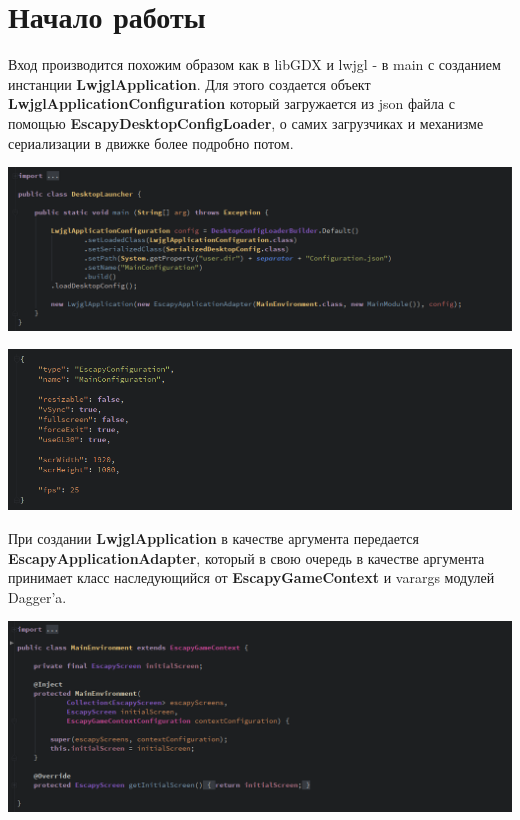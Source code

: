 \documentclass[11pt]{report}
\begin{document}
\chapter{Начало работы}
Вход производится похожим образом как в libGDX и lwjgl - в main с созданием инстанции
\textbf{LwjglApplication}. Для этого создается объект \textbf{LwjglApplicationConfiguration} который загружается из json файла с помощью 
\textbf{EscapyDesktopConfigLoader}, о самих загрузчиках и механизме сериализации в движке более подробно потом. 
\begin{center}
	\includegraphics[width=1.25\linewidth]{img/1.png} 
  	\label{img:12}
  	  	
  	\includegraphics[width=1.25\linewidth]{img/2.png}   	
\end{center}
При создании \textbf{LwjglApplication} в качестве аргумента передается\\
\textbf{EscapyApplicationAdapter}, который в свою очередь в качестве аргумента принимает класс наследующийся от \textbf{EscapyGameContext} и varargs модулей Dagger'a.
\begin{center}
	\includegraphics[width=1.25\linewidth]{img/3.png} 
  	\label{img:3} 
\end{center}
\end{document}
